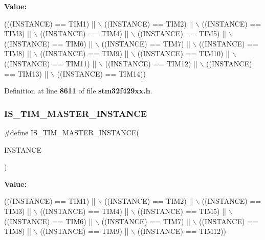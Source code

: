 {\bfseries Value\+:}
\begin{DoxyCode}
(((INSTANCE) == TIM1)   || \(\backslash\)
                                   ((INSTANCE) == TIM2)   || \(\backslash\)
                                   ((INSTANCE) == TIM3)   || \(\backslash\)
                                   ((INSTANCE) == TIM4)   || \(\backslash\)
                                   ((INSTANCE) == TIM5)   || \(\backslash\)
                                   ((INSTANCE) == TIM6)   || \(\backslash\)
                                   ((INSTANCE) == TIM7)   || \(\backslash\)
                                   ((INSTANCE) == TIM8)   || \(\backslash\)
                                   ((INSTANCE) == TIM9)   || \(\backslash\)
                                   ((INSTANCE) == TIM10)  || \(\backslash\)
                                   ((INSTANCE) == TIM11)  || \(\backslash\)
                                   ((INSTANCE) == TIM12)  || \(\backslash\)
                                   ((INSTANCE) == TIM13)  || \(\backslash\)
                                   ((INSTANCE) == TIM14))
\end{DoxyCode}


Definition at line \textbf{ 8611} of file \textbf{ stm32f429xx.\+h}.

\mbox{\label{group__Exported__macros_ga98104b1522d066b0c20205ca179d0eba}} 
\subsubsection{I\+S\+\_\+\+T\+I\+M\+\_\+\+M\+A\+S\+T\+E\+R\+\_\+\+I\+N\+S\+T\+A\+N\+CE}
{\footnotesize\ttfamily \#define I\+S\+\_\+\+T\+I\+M\+\_\+\+M\+A\+S\+T\+E\+R\+\_\+\+I\+N\+S\+T\+A\+N\+CE(\begin{DoxyParamCaption}\item[{}]{I\+N\+S\+T\+A\+N\+CE }\end{DoxyParamCaption})}

{\bfseries Value\+:}
\begin{DoxyCode}
(((INSTANCE) == TIM1) || \(\backslash\)
                                          ((INSTANCE) == TIM2) || \(\backslash\)
                                          ((INSTANCE) == TIM3) || \(\backslash\)
                                          ((INSTANCE) == TIM4) || \(\backslash\)
                                          ((INSTANCE) == TIM5) || \(\backslash\)
                                          ((INSTANCE) == TIM6) || \(\backslash\)
                                          ((INSTANCE) == TIM7) || \(\backslash\)
                                          ((INSTANCE) == TIM8) || \(\backslash\)
                                          ((INSTANCE) == TIM9) || \(\backslash\)
                                          ((INSTANCE) == TIM12))
\end{DoxyCode}


